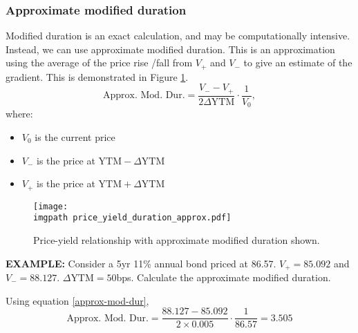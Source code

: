 \documentclass[../notes_compiled.tex]{subfiles}
\begin{document}
\subsubsection{Approximate modified duration}
\begin{itemize}
\item Modified duration is an exact calculation, and may be computationally intensive. Instead, we can use approximate modified duration. This is an approximation using the average of the price rise /fall from $V_{+}$ and $V_{-}$ to give an estimate of the gradient. This is demonstrated in Figure \ref{fig-approx-mod-dur}.
\begin{equation}
\text{Approx. Mod. Dur.} = \frac{V_{-} - V_{+}}{2\Delta\text{YTM}} \cdot \frac{1}{V_{0}}, \label{approx-mod-dur}
\end{equation}
where:
\begin{itemize}
\item[] $V_{0}$ is the current price
\item[] $V_{-}$ is the price at $\text{YTM}-\Delta\text{YTM}$
\item[] $V_{+}$ is the price at $\text{YTM}+\Delta\text{YTM}$
\end{itemize}

\begin{figure}[h]
  \centering
  \texttt{[image: \\imgpath price\_yield\_duration\_approx.pdf]}
  \caption{Price-yield relationship with approximate modified duration shown.}
  \label{fig-approx-mod-dur}
\end{figure}

{\color{RedViolet}
\item[] \textbf{EXAMPLE:} Consider a 5yr 11\% annual bond priced at 86.57. $V_{+} = 85.092$ and $V_{-} = 88.127$. $\Delta\text{YTM} = 50$bps. Calculate the approximate modified duration.
}


{\color{RoyalBlue}
Using equation \ref{approx-mod-dur},
\begin{equation*}
\text{Approx. Mod. Dur.} = \frac{88.127 - 85.092}{2\times0.005} \cdot \frac{1}{86.57} = 3.505
\end{equation*}
}

\end{itemize}
\end{document}
